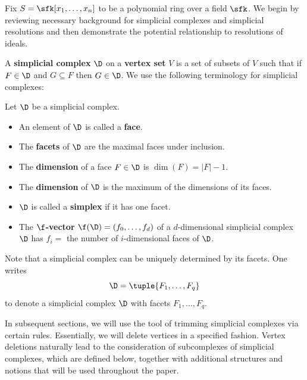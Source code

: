 Fix $S=\sfk[x_1,\ldots,x_n]$ to be a polynomial ring over a
        field $\sfk$.  We begin by reviewing necessary background for
        simplicial complexes and simplicial resolutions and then
        demonstrate the potential relationship to resolutions of
        ideals.


A {\bf simplicial complex} $\D$ on a {\bf vertex set } $V$ is a set
of subsets of $V$ such that if $F \in \D$ and $G \subseteq F$ then $G
\in \D$.  We use the following terminology for simplicial complexes:

\begin{defi}  Let $\D$ be a simplicial complex.
\begin{itemize}
\item An element of $\D$ is called a {\bf face}.
\item The {\bf facets} of $\D$ are the maximal faces under inclusion.
\item  The {\bf dimension} of a face $F \in \D$ is $\dim(F)=|F|-1$.
\item The {\bf dimension} of $\D$ is the maximum of the dimensions of its faces.
\item $\D$ is called a {\bf simplex} if it has one facet.
\item The {\bf $\f$-vector} $\f(\D)=(f_0,\ldots,f_d)$ of a
$d$-dimensional simplicial complex $\D$ has  $f_i=$
the number of $i$-dimensional faces of $\D$. 
\end{itemize}
\end{defi}

Note that a simplicial complex can be uniquely determined by its facets.  One writes
$$\D = \tuple{F_1, \ldots, F_q}$$
to denote a simplicial complex $\D$ with facets $F_1,\ldots,F_q$.


In subsequent sections, we will use the tool of trimming
        simplicial complexes via certain rules.  Essentially, we will
        delete vertices in a specified fashion.  Vertex deletions
        naturally lead to the consideration of subcomplexes of
        simplicial complexes, which are defined below, together with
        additional structures and notions that will be used throughout
        the paper.


